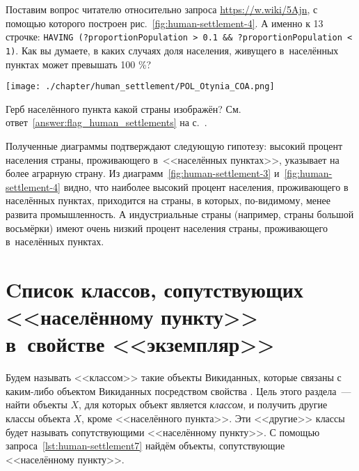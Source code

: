 Поставим вопрос читателю относительно запроса \href{https://w.wiki/5Ajn}{https://w.wiki/5Ajn}, 
с помощью которого построен рис.~\ref{fig:human-settlement-4}. 
А именно к 13 строчке: \lstinline|HAVING (?proportionPopulation > 0.1 && ?proportionPopulation < 1)|. 
Как вы думаете, в каких случаях доля населения, живущего в~населённых пунктах может превышать 100 \%?


\begin{marginfigure}[0.0cm]
{\texttt{[image: ./chapter/human\_settlement/POL\_Otynia\_COA.png]}}
  \caption[Герб четвёртого неизвестного населённого пункта.]{Герб населённого пункта какой страны изображён?\newline
См. ответ~\ref{answer:flag_human_settlements} на с.~\pageref{answer:flag_human_settlements}.}%
  \label{fig:flag_question_human_settlements4}%
\end{marginfigure}

Полученные диаграммы подтверждают следующую гипотезу: 
высокий процент населения страны, проживающего в~<<населённых пунктах>>, 
указывает на более аграрную страну. 
Из диаграмм~\ref{fig:human-settlement-3} и~\ref{fig:human-settlement-4} видно, 
что наиболее высокий процент населения, проживающего в населённых пунктах, 
приходится на страны, в которых, по-видимому, менее развита промышленность. 
А индустриальные страны (например, страны большой восьмёрки) имеют очень низкий процент населения страны, 
проживающего в~населённых пунктах.




\section[Cписок классов, сопутствующих <<населённому пункту>> в~свойстве <<экземпляр>>]{Cписок классов, сопутствующих <<населённому пункту>>\\в~свойстве <<экземпляр>>}
\label{human-settlement:tag1}

Будем называть <<классом>> такие объекты Викиданных, 
которые связаны с каким-либо объектом Викиданных посредством свойства . 
Цель этого раздела~--- найти объекты $X$, 
для которых объект  является \emph{классом}, 
и получить другие классы объекта $X$, кроме <<населённого пункта>>. 
Эти <<другие>> классы будет называть сопутствующими <<населённому пункту>>. 
С помощью запроса~\ref{lst:human-settlement7} 
найдём объекты, сопутствующие <<населённому пункту>>. 


